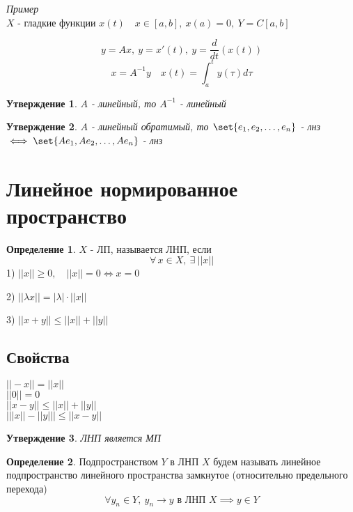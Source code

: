\documentclass[a4paper]{article}
\DeclarePairedDelimiter\set\{\}
\newtheorem*{statement}{Утверждение}
\theoremstyle{definition}
\newtheorem*{definition}{Определение}
\theoremstyle{remark}
\begin{document}
\emph{Пример}\\
$ X $ - гладкие функции $ x(t) \quad x \in [a,b], \ x(a) = 0, \ Y = C[a,b] $ 

\[
    y = Ax, \ y = x'(t), \ y = \frac{d}{dt}(x(t))
\]
\[
    x = A^{-1} y \quad x(t) = \int_{a}^{t} y(\tau) d \tau
\]

\begin{tcolorbox}
    \begin{statement}
        $ A $ - линейный, то $ A^{-1} $ - линейный
    \end{statement}
\end{tcolorbox}

\begin{tcolorbox}
    \begin{statement}
        $ A $ - линейный обратимый, то $ \set{e_1, e_2, \dots , e_n} $ - лнз
        $ \iff \set{Ae_1, Ae_2, \dots, Ae_n} $ - лнз 
    \end{statement}
\end{tcolorbox}

\section*{\centering Линейное нормированное пространство}
\begin{tcolorbox}
    \begin{definition}
        $ X $ - ЛП, называется ЛНП, если  
        \[
            \forall \, x \in X, \ \exists \ ||x||
        \]
        1) $ ||x|| \geq 0, \quad ||x|| = 0 \iff x = 0 $ 

        2) $ ||\lambda x|| = |\lambda| \cdot ||x|| $ 

        3) $ ||x+y|| \leq ||x|| + ||y|| $ 
    \end{definition}
\end{tcolorbox}

\subsection*{Свойства}
$ || -x || = ||x|| $\\
$ ||0|| = 0 $\\
$ ||x-y|| \leq ||x|| + ||y|| $ \\
$ \bigg| ||x|| - ||y|| \bigg| \leq ||x-y|| $ 

\begin{tcolorbox}
    \begin{statement}
        ЛНП является МП
    \end{statement}
\end{tcolorbox}

\begin{tcolorbox}
    \begin{definition}
        Подпространством $ Y $ в ЛНП $ X $ будем называть линейное подпространство
        линейного пространства замкнутое (относительно предельного перехода)
        \[
            \forall y_n \in Y, \ y_n \to y \text{ в ЛНП } X \implies y \in Y
        \]
    \end{definition}
\end{tcolorbox}
\end{document}
